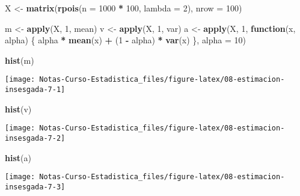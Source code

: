 \documentclass[
  12pt,
]{book}
\newenvironment{Shaded}{\begin{snugshade}}{\end{snugshade}}
\newcommand{\ControlFlowTok}[1]{\textcolor[rgb]{0.13,0.29,0.53}{\textbf{#1}}}
\newcommand{\DataTypeTok}[1]{\textcolor[rgb]{0.13,0.29,0.53}{#1}}
\newcommand{\DecValTok}[1]{\textcolor[rgb]{0.00,0.00,0.81}{#1}}
\newcommand{\KeywordTok}[1]{\textcolor[rgb]{0.13,0.29,0.53}{\textbf{#1}}}
\newcommand{\NormalTok}[1]{#1}
\newcommand{\OperatorTok}[1]{\textcolor[rgb]{0.81,0.36,0.00}{\textbf{#1}}}
\newcommand{\StringTok}[1]{\textcolor[rgb]{0.31,0.60,0.02}{#1}}
\begin{document}
\begin{Shaded}
\begin{Highlighting}[]
\NormalTok{X \textless{}{-}}\StringTok{ }\KeywordTok{matrix}\NormalTok{(}\KeywordTok{rpois}\NormalTok{(}\DataTypeTok{n =} \DecValTok{1000} \OperatorTok{*}\StringTok{ }\DecValTok{100}\NormalTok{, }\DataTypeTok{lambda =} \DecValTok{2}\NormalTok{), }\DataTypeTok{nrow =} \DecValTok{100}\NormalTok{)}

\NormalTok{m \textless{}{-}}\StringTok{ }\KeywordTok{apply}\NormalTok{(X, }\DecValTok{1}\NormalTok{, mean)}
\NormalTok{v \textless{}{-}}\StringTok{ }\KeywordTok{apply}\NormalTok{(X, }\DecValTok{1}\NormalTok{, var)}
\NormalTok{a \textless{}{-}}\StringTok{ }\KeywordTok{apply}\NormalTok{(X, }\DecValTok{1}\NormalTok{, }\ControlFlowTok{function}\NormalTok{(x, alpha) \{}
\NormalTok{  alpha }\OperatorTok{*}\StringTok{ }\KeywordTok{mean}\NormalTok{(x) }\OperatorTok{+}\StringTok{ }\NormalTok{(}\DecValTok{1} \OperatorTok{{-}}\StringTok{ }\NormalTok{alpha) }\OperatorTok{*}\StringTok{ }\KeywordTok{var}\NormalTok{(x)}
\NormalTok{\}, }\DataTypeTok{alpha =} \DecValTok{10}\NormalTok{)}

\KeywordTok{hist}\NormalTok{(m)}
\end{Highlighting}
\end{Shaded}

\begin{center}\texttt{[image: Notas-Curso-Estadistica\_files/figure-latex/08-estimacion-insesgada-7-1]} \end{center}

\begin{Shaded}
\begin{Highlighting}[]
\KeywordTok{hist}\NormalTok{(v)}
\end{Highlighting}
\end{Shaded}

\begin{center}\texttt{[image: Notas-Curso-Estadistica\_files/figure-latex/08-estimacion-insesgada-7-2]} \end{center}

\begin{Shaded}
\begin{Highlighting}[]
\KeywordTok{hist}\NormalTok{(a)}
\end{Highlighting}
\end{Shaded}

\begin{center}\texttt{[image: Notas-Curso-Estadistica\_files/figure-latex/08-estimacion-insesgada-7-3]} \end{center}
\end{document}
